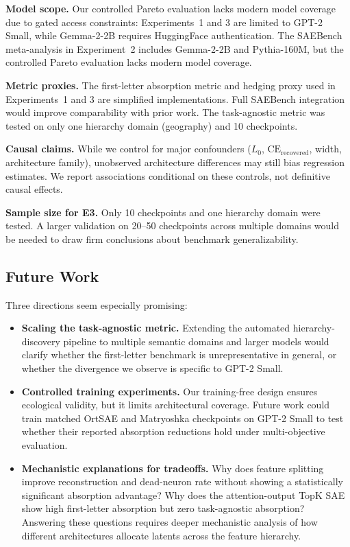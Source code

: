 \documentclass{article}
\begin{document}
\textbf{Model scope.} Our controlled Pareto evaluation lacks modern model coverage due to gated access constraints: Experiments~1 and 3 are limited to GPT-2 Small, while Gemma-2-2B requires HuggingFace authentication. The SAEBench meta-analysis in Experiment~2 includes Gemma-2-2B and Pythia-160M, but the controlled Pareto evaluation lacks modern model coverage.

\textbf{Metric proxies.} The first-letter absorption metric and hedging proxy used in Experiments~1 and 3 are simplified implementations. Full SAEBench integration would improve comparability with prior work. The task-agnostic metric was tested on only one hierarchy domain (geography) and 10 checkpoints.

\textbf{Causal claims.} While we control for major confounders ($L_0$, $\text{CE}_{\text{recovered}}$, width, architecture family), unobserved architecture differences may still bias regression estimates. We report associations conditional on these controls, not definitive causal effects.

\textbf{Sample size for E3.} Only 10 checkpoints and one hierarchy domain were tested. A larger validation on 20--50 checkpoints across multiple domains would be needed to draw firm conclusions about benchmark generalizability.

\subsection{Future Work}

Three directions seem especially promising:

\begin{itemize}
    \item \textbf{Scaling the task-agnostic metric.} Extending the automated hierarchy-discovery pipeline to multiple semantic domains and larger models would clarify whether the first-letter benchmark is unrepresentative in general, or whether the divergence we observe is specific to GPT-2 Small.
    \item \textbf{Controlled training experiments.} Our training-free design ensures ecological validity, but it limits architectural coverage. Future work could train matched OrtSAE and Matryoshka checkpoints on GPT-2 Small to test whether their reported absorption reductions hold under multi-objective evaluation.
    \item \textbf{Mechanistic explanations for tradeoffs.} Why does feature splitting improve reconstruction and dead-neuron rate without showing a statistically significant absorption advantage? Why does the attention-output TopK SAE show high first-letter absorption but zero task-agnostic absorption? Answering these questions requires deeper mechanistic analysis of how different architectures allocate latents across the feature hierarchy.
\end{itemize}
\end{document}
